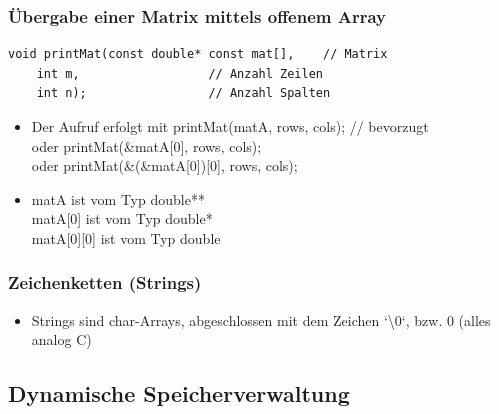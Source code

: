 \subsubsection{Übergabe einer Matrix mittels offenem Array}
\label{sec:Uebergabe einer Matrix mittels offenem Array}
\noindent
\begin{minipage}{\linewidth}
\begin{lstlisting}
void printMat(const double* const mat[],	// Matrix
	int m,					// Anzahl Zeilen
	int n);					// Anzahl Spalten
\end{lstlisting}
\end{minipage}
\begin{itemize}
	\item Der Aufruf erfolgt mit \hspace{5mm}printMat(matA, rows, cols); // bevorzugt\\
		oder	\hspace{3.4cm} printMat(\&matA[0], rows, cols);\\
		oder \hspace{3.4cm} printMat(\&(\&matA[0])[0], rows, cols);
	\item matA \hspace{1cm} ist vom Typ double**\\
		matA[0] \hspace{6mm} ist vom Typ double*\\
		matA[0][0] \hspace{2mm} ist vom Typ double
\end{itemize}

\subsubsection{Zeichenketten (Strings)}
\label{sec:Zeichenketten (Strings)}
\begin{itemize}
	\item Strings sind char-Arrays, abgeschlossen mit dem Zeichen `\textbackslash0`, bzw. 0 (alles analog C)
\end{itemize}

\subsection{Dynamische Speicherverwaltung}
\label{sec:Dynamische Speicherverwaltung}

